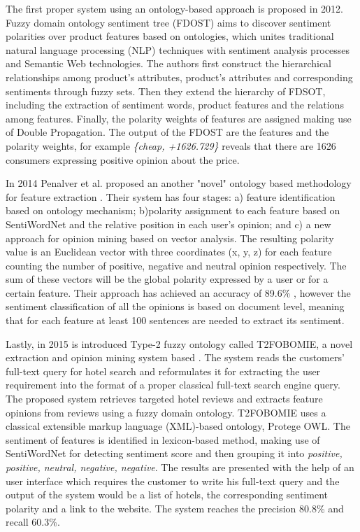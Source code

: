The first proper system using an ontology-based approach is proposed in 2012. Fuzzy domain ontology sentiment tree (FDOST) \cite{liu2012toward} aims to discover sentiment polarities over product features based on ontologies, which unites traditional natural language processing (NLP) techniques with sentiment analysis processes and Semantic Web technologies. The authors first construct the hierarchical relationships among product's attributes, product's attributes and corresponding sentiments through fuzzy sets. Then they extend the hierarchy of FDSOT, including the extraction of sentiment words, product features and the relations among features. Finally, the polarity weights of features are assigned making use of Double Propagation. The output of the FDOST are the features and the polarity weights, for example \textit{\{cheap, +1626.729\}} reveals that there are 1626 consumers expressing positive opinion about the price.

In 2014 Penalver et al. proposed an another "novel" ontology based methodology for feature extraction \cite{penalver2014feature}. Their system has four stages: a) feature identification based on ontology mechanism; b)polarity assignment to each feature based on SentiWordNet and the relative position in each user's opinion; and c) a new approach for opinion mining based on vector analysis. The resulting polarity value is an Euclidean vector with three coordinates (x, y, z) for each feature counting the number of positive, negative and neutral opinion respectively. The sum of these vectors will be the global polarity expressed by a user or for a certain feature. Their approach has achieved an accuracy of 89.6\% , however the sentiment classification of all the opinions is based on document level, meaning that for each feature at least 100 sentences are needed to extract its sentiment.

Lastly, in 2015 is introduced Type-2 fuzzy ontology called T2FOBOMIE, a novel extraction and opinion mining system based \cite{ali2015type}. The system reads the  customers' full-text query for hotel search and reformulates it for extracting the user requirement into the format of a proper classical full-text search engine query. The proposed system retrieves targeted hotel reviews and extracts feature opinions from reviews using a fuzzy domain ontology. T2FOBOMIE uses a classical extensible markup language (XML)-based ontology, Protege OWL. The sentiment of features is identified in lexicon-based method, making use of SentiWordNet for detecting sentiment score and then grouping it into \textit{positive, positive, neutral, negative, negative}. The results are presented with the help of an user interface which requires the customer to write his full-text query and the output of the system would be a list of hotels, the corresponding sentiment polarity and a link to the website. The system reaches the precision 80.8\% and recall 60.3\%.

